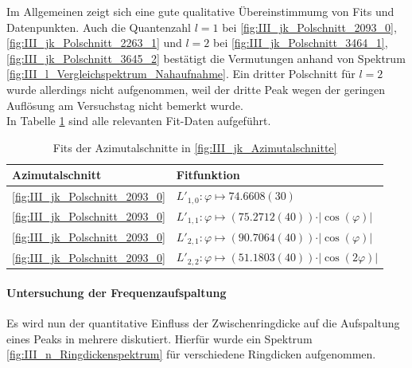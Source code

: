 \documentclass[../main.tex]{subfiles}
\begin{document}
        Im Allgemeinen zeigt sich eine gute qualitative Übereinstimmumg von Fits und Datenpunkten. Auch die Quantenzahl $l=1$ bei \ref{fig:III_jk_Polschnitt_2093_0}, \ref{fig:III_jk_Polschnitt_2263_1} und $l=2$ bei \ref{fig:III_jk_Polschnitt_3464_1}, \ref{fig:III_jk_Polschnitt_3645_2} bestätigt die Vermutungen anhand von Spektrum \ref{fig:III_l_Vergleichspektrum_Nahaufnahme}. Ein dritter Polschnitt für $l=2$ wurde allerdings nicht aufgenommen, weil der dritte Peak wegen der geringen Auflösung am Versuchstag nicht bemerkt wurde.\\

        In Tabelle \ref{tab:III_jk_Azimutalschnitte} sind alle relevanten Fit-Daten aufgeführt.

        \begin{table}[H]
            \centering
                \begin{tabular}{l|l}
                    \textbf{Azimutalschnitt} & \textbf{Fitfunktion}\\
                    \hline\hline
                    \ref{fig:III_jk_Polschnitt_2093_0} & $L'_{1,0}: \varphi\mapsto 74.6608(30)$\\
                    \ref{fig:III_jk_Polschnitt_2093_0} & $L'_{1,1}: \varphi\mapsto (75.2712(40))\cdot\vert\cos(\varphi)\vert$\\
                    \ref{fig:III_jk_Polschnitt_2093_0} & $L'_{2,1}: \varphi\mapsto (90.7064(40))\cdot\vert\cos(\varphi)\vert$\\
                    \ref{fig:III_jk_Polschnitt_2093_0} & $L'_{2,2}: \varphi\mapsto (51.1803(40))\cdot\vert\cos(2\varphi)\vert$
                \end{tabular}
                \caption{Fits der Azimutalschnitte in \ref{fig:III_jk_Azimutalschnitte}}
                \label{tab:III_jk_Azimutalschnitte}
        \end{table}

    \paragraph{Untersuchung der Frequenzaufspaltung}
        Es wird nun der quantitative Einfluss der Zwischenringdicke auf die Aufspaltung eines Peaks in mehrere diskutiert. Hierfür wurde ein Spektrum \ref{fig:III_n_Ringdickenspektrum} für verschiedene Ringdicken aufgenommen.
        
\end{document}
